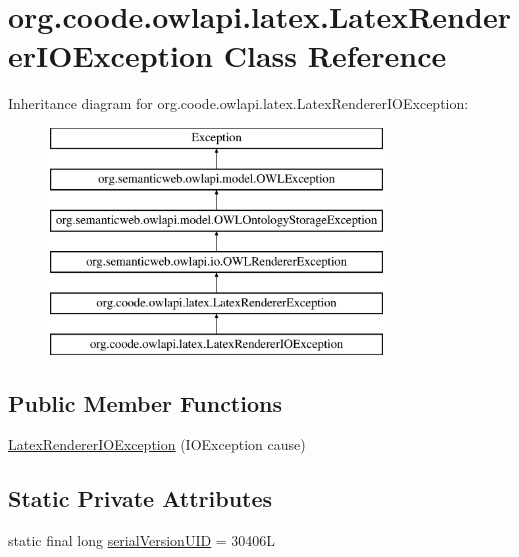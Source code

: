 \hypertarget{classorg_1_1coode_1_1owlapi_1_1latex_1_1_latex_renderer_i_o_exception}{\section{org.\-coode.\-owlapi.\-latex.\-Latex\-Renderer\-I\-O\-Exception Class Reference}
\label{classorg_1_1coode_1_1owlapi_1_1latex_1_1_latex_renderer_i_o_exception}
}
Inheritance diagram for org.\-coode.\-owlapi.\-latex.\-Latex\-Renderer\-I\-O\-Exception\-:\begin{figure}[H]
\begin{center}
\leavevmode
\includegraphics[height=6.000000cm]{classorg_1_1coode_1_1owlapi_1_1latex_1_1_latex_renderer_i_o_exception}
\end{center}
\end{figure}
\subsection*{Public Member Functions}
\begin{DoxyCompactItemize}
\item 
\hyperlink{classorg_1_1coode_1_1owlapi_1_1latex_1_1_latex_renderer_i_o_exception_a765ea320f5407288c0eaaa25b736bd1c}{Latex\-Renderer\-I\-O\-Exception} (I\-O\-Exception cause)
\end{DoxyCompactItemize}
\subsection*{Static Private Attributes}
\begin{DoxyCompactItemize}
\item 
static final long \hyperlink{classorg_1_1coode_1_1owlapi_1_1latex_1_1_latex_renderer_i_o_exception_a7f7915b1db7e472b90b192f7b85b31b4}{serial\-Version\-U\-I\-D} = 30406\-L
\end{DoxyCompactItemize}
